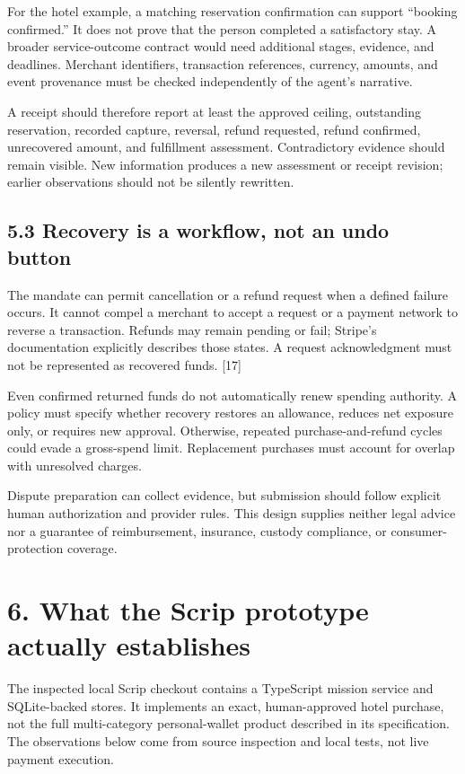 \documentclass[
  11pt,
  letterpaper,
]{article}
\begin{document}
For the hotel example, a matching reservation confirmation can support
``booking confirmed.'' It does not prove that the person completed a
satisfactory stay. A broader service-outcome contract would need
additional stages, evidence, and deadlines. Merchant identifiers,
transaction references, currency, amounts, and event provenance must be
checked independently of the agent's narrative.

A receipt should therefore report at least the approved ceiling,
outstanding reservation, recorded capture, reversal, refund requested,
refund confirmed, unrecovered amount, and fulfillment assessment.
Contradictory evidence should remain visible. New information produces a
new assessment or receipt revision; earlier observations should not be
silently rewritten.

\subsection{5.3 Recovery is a workflow, not an undo
button}\label{recovery-is-a-workflow-not-an-undo-button}

The mandate can permit cancellation or a refund request when a defined
failure occurs. It cannot compel a merchant to accept a request or a
payment network to reverse a transaction. Refunds may remain pending or
fail; Stripe's documentation explicitly describes those states. A
request acknowledgment must not be represented as recovered funds.
{[}17{]}

Even confirmed returned funds do not automatically renew spending
authority. A policy must specify whether recovery restores an allowance,
reduces net exposure only, or requires new approval. Otherwise, repeated
purchase-and-refund cycles could evade a gross-spend limit. Replacement
purchases must account for overlap with unresolved charges.

Dispute preparation can collect evidence, but submission should follow
explicit human authorization and provider rules. This design supplies
neither legal advice nor a guarantee of reimbursement, insurance,
custody compliance, or consumer-protection coverage.

\section{6. What the Scrip prototype actually
establishes}\label{what-the-scrip-prototype-actually-establishes}

The inspected local Scrip checkout contains a TypeScript mission service
and SQLite-backed stores. It implements an exact, human-approved hotel
purchase, not the full multi-category personal-wallet product described
in its specification. The observations below come from source inspection
and local tests, not live payment execution.
\end{document}
